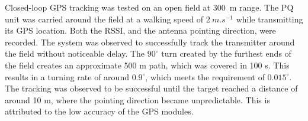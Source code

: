 Closed-loop GPS tracking was tested on an open field at \SI{300}{m} range. The PQ unit was carried around the field at a walking speed of $\SI{2}{m.s^{-1}}$ while transmitting its GPS location. Both the RSSI, and the antenna pointing direction, were recorded. The system was observed to successfully track the transmitter around the field without noticeable delay. The $90^\circ$ turn created by the furthest ends of the field creates an approximate 500 m path, which was covered in 100 s. This results in a turning rate of around $0.9 ^ \circ$, which meets the requirement of $0.015 ^ \circ$. The tracking was observed to be successful until the target reached a distance of around 10 m, where the pointing direction became unpredictable. This is attributed to the low accuracy of the GPS modules.